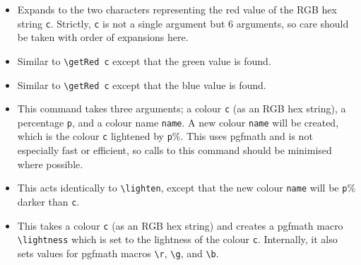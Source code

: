 \documentclass[]{article}
\begin{document}
  \begin{itemize}[leftmargin = 1.75in, labelsep = 0.75cm]
        \item[\texttt{\textbackslash{}getRed c}] Expands to the two characters representing the red value of the RGB hex string \texttt{c}. Strictly, \texttt{c} is not a single argument but 6 arguments, so care should be taken with order of expansions here.
        \item[\texttt{\textbackslash{}getGreen c}] Similar to \verb|\getRed c| except that the green value is found.
        \item[\texttt{\textbackslash{}getBlue c}] Similar to \verb|\getRed c| except that the blue value is found.
        \item[\texttt{\textbackslash{}lighten\{c\}\{p\}\{name\}}] This command takes three arguments; a colour \texttt{c} (as an RGB hex string), a percentage \texttt{p}, and a colour name \texttt{name}. A new colour \texttt{name} will be created, which is the colour \texttt{c} lightened by \texttt{p}\%. This uses pgfmath and is not especially fast or efficient, so calls to this command should be minimised where possible.
        \item[\texttt{\textbackslash{}darken\{c\}\{p\}\{name\}}] This acts identically to \verb|\lighten|, except that the new colour \texttt{name} will be \texttt{p}\% darker than \texttt{c}.
        \item[\texttt{\textbackslash{}getLightness\{c\}}] This takes a colour \texttt{c} (as an RGB hex string) and creates a pgfmath macro \verb|\lightness| which is set to the lightness of the colour \texttt{c}. Internally, it also sets values for pgfmath macros \verb|\r|, \verb|\g|, and \verb|\b|.
    \end{itemize}
\end{document}
